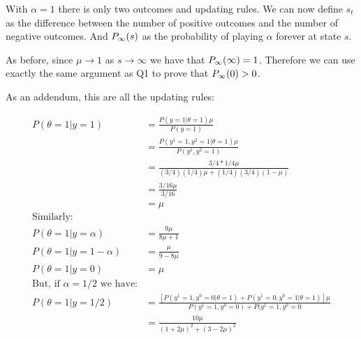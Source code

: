 \documentclass{article}
\begin{document}
With $\alpha = 1$ there is only two outcomes and updating rules. We can now define
$s_t$ as the difference between the number of positive outcomes and the number
of negative outcomes. And $P_{\infty}(s)$ as the probability of playing $\alpha$
forever at state $s$.

As before, since $\mu \to 1$ as $s \to \infty$ we have that $P_{\infty}(\infty) = 1$.
Therefore we can use exactly the same argument as Q1 to prove that $P_{\infty}(0) > 0$.


As an addendum, this are all the updating rules:

\begin{equation}
\begin{split}
P(\theta = 1 | y = 1) & = \frac{P(y = 1| \theta = 1) \mu}{P(y = 1)} \\
                      & = \frac{P(y^1 = 1, y^2 = 1 | \theta = 1)\mu}{P(y^1, y^2=1)} \\
                      & = \frac{3/4*1/4\mu}{(3/4)(1/4)\mu + (1/4)(3/4)(1 - \mu)} \\
                      & = \frac{3/16\mu}{3/16} \\
                      & = \mu \\
\text{Similarly:}     & \\
P(\theta = 1|y=\alpha)& = \frac{9\mu}{8\mu + 1} \\
P(\theta=1|y=1-\alpha)& = \frac{\mu}{9 - 8\mu} \\
P(\theta = 1| y = 0)  & = \mu \\
\text{But, if $\alpha = 1/2$ we have:} \\
P(\theta = 1|y = 1/2) & = \frac{[P(y^1 = 1, y^0 = 0 | \theta = 1) +
                                P(y^1 = 0, y^0 = 1 | \theta = 1)]\mu}
                               {P(y^1 = 1, y^0 = 0) + P(y^1 = 1, y^0 = 0} \\
                      & = \frac{10\mu}{(1 + 2\mu)^2 + (3 - 2\mu)^2} \\
\end{split}
\end{equation}
\end{document}
